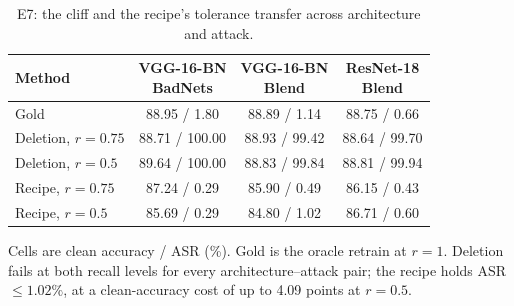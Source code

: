\begin{table}[t]
\centering
\caption{E7: the cliff and the recipe's tolerance transfer across architecture and attack.}
\label{tab:e7}
\footnotesize
\setlength{\tabcolsep}{4pt}
\begin{tabular}{lccc}
\toprule
\textbf{Method} & \shortstack{\textbf{VGG-16-BN}\\\textbf{BadNets}} & \shortstack{\textbf{VGG-16-BN}\\\textbf{Blend}} & \shortstack{\textbf{ResNet-18}\\\textbf{Blend}} \\
\midrule
Gold & 88.95 / 1.80 & 88.89 / 1.14 & 88.75 / 0.66 \\
Deletion, $r{=}0.75$ & 88.71 / 100.00 & 88.93 / 99.42 & 88.64 / 99.70 \\
Deletion, $r{=}0.5$ & 89.64 / 100.00 & 88.83 / 99.84 & 88.81 / 99.94 \\
Recipe, $r{=}0.75$ & 87.24 / 0.29 & 85.90 / 0.49 & 86.15 / 0.43 \\
Recipe, $r{=}0.5$ & 85.69 / 0.29 & 84.80 / 1.02 & 86.71 / 0.60 \\
\bottomrule
\end{tabular}
\par\vspace{1pt}\footnotesize\raggedright Cells are clean accuracy / ASR (\%). Gold is the oracle retrain at $r{=}1$. Deletion fails at both recall levels for every architecture--attack pair; the recipe holds ASR $\leq1.02\%$, at a clean-accuracy cost of up to 4.09 points at $r{=}0.5$.
\end{table}
